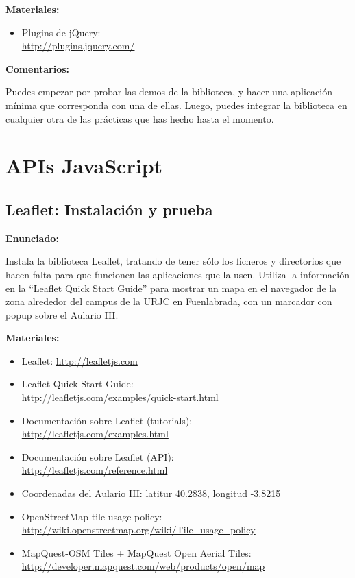 \textbf{Materiales:}

\begin{itemize}
\item Plugins de jQuery: \\
  \url{http://plugins.jquery.com/}
\end{itemize}

\textbf{Comentarios:}

Puedes empezar por probar las demos de la biblioteca, y hacer una aplicación mínima que corresponda con una de ellas. Luego, puedes integrar la biblioteca en cualquier otra de las prácticas que has hecho hasta el momento.

\section{APIs JavaScript}

\subsection{Leaflet: Instalación y prueba}
\label{subsec:apis-leaflet-instal}

\textbf{Enunciado:}

Instala la biblioteca Leaflet, tratando de tener sólo los ficheros y directorios que hacen falta para que funcionen las aplicaciones que la usen. Utiliza la información en la ``Leaflet Quick Start Guide'' para mostrar un mapa en el navegador de la zona alrededor del campus de la URJC en Fuenlabrada, con un marcador con popup sobre el Aulario III.

\textbf{Materiales:}

\begin{itemize}
\item Leaflet: \url{http://leafletjs.com}
\item Leaflet Quick Start Guide: \\
  \url{http://leafletjs.com/examples/quick-start.html}
\item Documentación sobre Leaflet (tutorials): \\
  \url{http://leafletjs.com/examples.html}
\item Documentación sobre Leaflet (API): \\
  \url{http://leafletjs.com/reference.html}
\item Coordenadas del Aulario III: latitur 40.2838, longitud -3.8215
\item OpenStreetMap tile usage policy: \\
  \url{http://wiki.openstreetmap.org/wiki/Tile_usage_policy}
\item MapQuest-OSM Tiles + MapQuest Open Aerial Tiles: \\
  \url{http://developer.mapquest.com/web/products/open/map}
\end{itemize}

